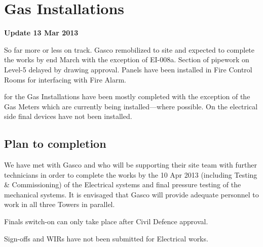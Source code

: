 \chapter{Gas Installations}

\begin{update}
\centerline{\textbf{Update 13 Mar 2013}}
So far more or less on track. Gasco remobilized to site and expected to complete the works by end March with the exception of EI-008a. Section of pipework on Level-5 delayed by drawing approval. Panels
have been installed in Fire Control Rooms for interfacing with Fire Alarm.
\end{update}

 for the Gas Installations have been mostly completed with the exception of the Gas Meters which are currently being installed---where possible. On the electrical side final devices have not been installed. 

\section{Plan to completion}

We have met with Gasco and who will be supporting their site team with further technicians in order to complete the works by the 10 Apr 2013 (including Testing \& Commissioning) of the Electrical systems and final pressure testing of the mechanical systems. It is envisaged that Gasco will provide adequate personnel to
work in all three Towers in parallel.

Finals switch-on can only take place after Civil Defence approval.

Sign-offs and WIRs have not been submitted for Electrical works.
\vspace*{1.5cm}

